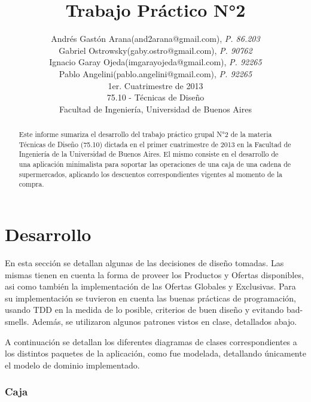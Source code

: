 \documentclass[a4paper,11pt]{article}
\title{\textbf{Trabajo Práctico N°2}}
\author{
  Andrés Gastón Arana(and2arana@gmail.com), \textit{P. 86.203}     \\
  Gabriel Ostrowsky(gaby.ostro@gmail.com), \textit{P. 90762}       \\
  Ignacio Garay Ojeda(imgarayojeda@gmail.com), \textit{P. 92265}   \\
  Pablo Angelini(pablo.angelini@gmail.com), \textit{P. 92265}      \\
  \normalsize{1er. Cuatrimestre de 2013}                           \\
  \normalsize{75.10 - Técnicas de Diseño}                          \\
  \normalsize{Facultad de Ingeniería, Universidad de Buenos Aires}
}
\date{}
\begin{document}
\thispagestyle{empty}
\maketitle

\begin{abstract}

  Este informe sumariza el desarrollo del trabajo práctico grupal N°2 de la
  materia Técnicas de Diseño (75.10) dictada en el primer cuatrimestre de 2013
  en la Facultad de Ingeniería de la Universidad de Buenos Aires. El mismo
  consiste en el desarrollo de una aplicación minimalista para soportar las
  operaciones de una caja de una cadena de supermercados, aplicando los
  descuentos correspondientes vigentes al momento de la compra.

\end{abstract}

\clearpage

\tableofcontents
\clearpage


\part{Desarrollo}

En esta sección se detallan algunas de las decisiones de diseño tomadas. Las
mismas tienen en cuenta la forma de proveer los Productos y Ofertas
disponibles, asi como también la implementación de las Ofertas Globales y
Exclusivas.  Para su implementación se tuvieron en cuenta las buenas prácticas
de programación, usando TDD en la medida de lo posible, criterios de buen
diseño y evitando bad-smells.  Además, se utilizaron algunos patrones vistos en
clase, detallados abajo.

A continuación se detallan los diferentes diagramas de clases correspondientes
a los distintos paquetes de la aplicación, como fue modelada, detallando
únicamente el modelo de dominio implementado.

\section{Caja}
\end{document}

